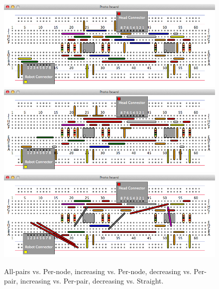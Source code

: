 \begin{figure}[H]
\begin{center}
\includegraphics[width=\textwidth]{Images/exemplar_per_pair_increasing.png}
\includegraphics[width=\textwidth]{Images/exemplar_per_pair_decreasing.png}
\includegraphics[width=\textwidth]{Images/exemplar_straight_wiring.png}
\caption{All-pairs vs. Per-node, increasing vs. Per-node, decreasing
vs. Per-pair, increasing vs. Per-pair, decreasing vs. Straight.}
\end{center}
\end{figure}

